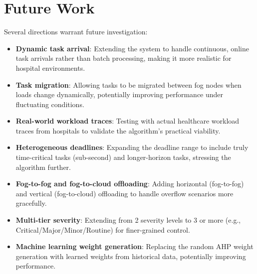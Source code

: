 \section{Future Work}

Several directions warrant future investigation:

\begin{itemize}
\item \textbf{Dynamic task arrival}: Extending the system to handle continuous, online task arrivals rather than batch processing, making it more realistic for hospital environments.

\item \textbf{Task migration}: Allowing tasks to be migrated between fog nodes when loads change dynamically, potentially improving performance under fluctuating conditions.

\item \textbf{Real-world workload traces}: Testing with actual healthcare workload traces from hospitals to validate the algorithm's practical viability.

\item \textbf{Heterogeneous deadlines}: Expanding the deadline range to include truly time-critical tasks (sub-second) and longer-horizon tasks, stressing the algorithm further.

\item \textbf{Fog-to-fog and fog-to-cloud offloading}: Adding horizontal (fog-to-fog) and vertical (fog-to-cloud) offloading to handle overflow scenarios more gracefully.

\item \textbf{Multi-tier severity}: Extending from 2 severity levels to 3 or more (e.g., Critical/Major/Minor/Routine) for finer-grained control.

\item \textbf{Machine learning weight generation}: Replacing the random AHP weight generation with learned weights from historical data, potentially improving performance.
\end{itemize}